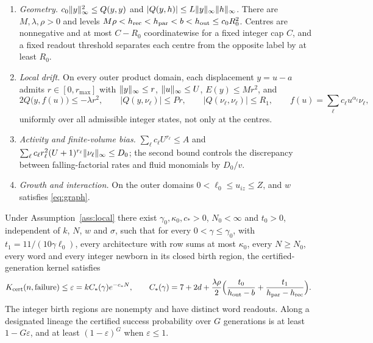 \begin{assumption}\label{ass:local}
\begin{enumerate}[label=(H\arabic*)]
\item \emph{Geometry.} $c_0\lVert y\rVert_\infty^2\le Q(y,y)$ and $|Q(y,h)|\le L\lVert y\rVert_\infty\lVert h\rVert_\infty$. There are $M,\lambda,\rho>0$ and levels $M\rho<h_{\rm rec}<h_{\rm par}<b<h_{\rm out}\le c_0R_0^2$. Centres are nonnegative and at most $C-R_0$ coordinatewise for a fixed integer cap $C$, and a fixed readout threshold separates each centre from the opposite label by at least $R_0$.
\item \emph{Local drift.} On every outer product domain, each displacement $y=u-a$ admits $r\in[0,r_{\max}]$ with $\lVert y\rVert_\infty\le r$, $\lVert u\rVert_\infty\le U$, $E(y)\le Mr^2$, and
\[
 2Q\bigl(y,f(u)\bigr)\le-\lambda r^2,\qquad |Q(y,\nu_\ell)|\le Pr,\qquad |Q(\nu_\ell,\nu_\ell)|\le R_1,\qquad f(u)=\sum_\ell c_\ell u^{\alpha_\ell}\nu_\ell,
\]
uniformly over all admissible integer states, not only at the centres.
\item \emph{Activity and finite-volume bias.} $\sum_\ell c_\ell U^{r_\ell}\le A$ and $\sum_\ell c_\ell r_\ell^2(U+1)^{r_\ell}\lVert\nu_\ell\rVert_\infty\le D_0$; the second bound controls the discrepancy between falling-factorial rates and fluid monomials by $D_0/v$.
\item \emph{Growth and interaction.} On the outer domains $0<\ell_0\le u_{iz}\le Z$, and $w$ satisfies \eqref{eq:graph}.
\end{enumerate}
\end{assumption}

\begin{theorem}\label{thm:general}
Under Assumption~\ref{ass:local} there exist $\gamma_0,\kappa_0,c_*>0$, $N_0<\infty$ and $t_0>0$, independent of $k$, $N$, $w$ and $\sigma$, such that for every $0<\gamma\le\gamma_0$, with $t_1=11/(10\gamma\ell_0)$, every architecture with row sums at most $\kappa_0$, every $N\ge N_0$, every word and every integer newborn in its closed birth region, the certified-generation kernel satisfies
\begin{equation}\label{eq:generalerror}
 K_{\rm cert}(n,\mathrm{failure})\le\varepsilon=kC_*(\gamma)e^{-c_*N},\qquad
 C_*(\gamma)=7+2d+\frac{\lambda\rho}2\Bigl(\frac{t_0}{h_{\rm out}-b}+\frac{t_1}{h_{\rm par}-h_{\rm rec}}\Bigr).
\end{equation}
The integer birth regions are nonempty and have distinct word readouts. Along a designated lineage the certified success probability over $G$ generations is at least $1-G\varepsilon$, and at least $(1-\varepsilon)^G$ when $\varepsilon\le1$.
\end{theorem}

